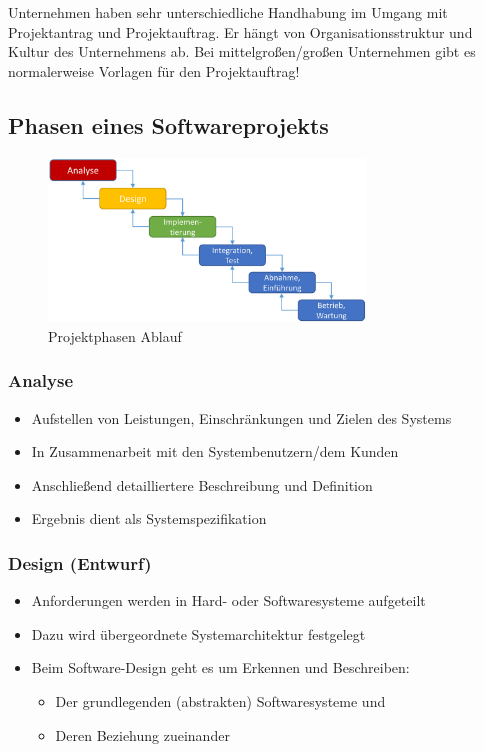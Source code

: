 \documentclass[11pt, a4paper]{article}
\begin{document}
Unternehmen haben sehr unterschiedliche Handhabung im Umgang mit Projektantrag und Projektauftrag. 
Er hängt von Organisationsstruktur und Kultur des Unternehmens ab.
Bei mittelgroßen/großen Unternehmen gibt es normalerweise Vorlagen für den Projektauftrag!

\subsection{Phasen eines Softwareprojekts}

\begin{figure}[h]
    \centering
    \includegraphics[width=0.75\textwidth]{Projektphasen-01}
    \caption{Projektphasen Ablauf}
    \label{fig:Projektphasen-01}
\end{figure}

\subsubsection*{Analyse}

\begin{itemize}
    \item Aufstellen von Leistungen, Einschränkungen und Zielen des Systems
    \item In Zusammenarbeit mit den Systembenutzern/dem Kunden
    \item Anschließend detailliertere Beschreibung und Definition
    \item Ergebnis dient als Systemspezifikation
\end{itemize}

\subsubsection*{Design (Entwurf)}

\begin{itemize}
    \item Anforderungen werden in Hard- oder Softwaresysteme aufgeteilt
    \item Dazu wird übergeordnete Systemarchitektur festgelegt
    \item Beim Software-Design geht es um Erkennen und Beschreiben:
    \begin{itemize}
        \item Der grundlegenden (abstrakten) Softwaresysteme und
        \item Deren Beziehung zueinander
    \end{itemize}
\end{itemize}
\end{document}
